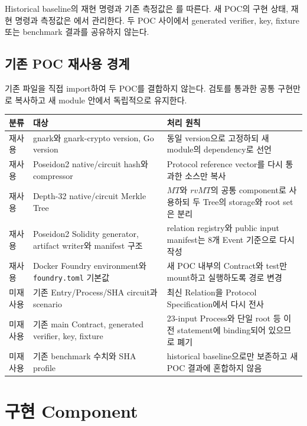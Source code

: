 \documentclass[11pt,a4paper]{extarticle}
\begin{document}
Historical baseline의 재현 명령과 기존 측정값은 를 따른다.
새 POC의 구현 상태, 재현 명령과 측정값은 에서 관리한다.
두 POC 사이에서 generated verifier, key, fixture 또는 benchmark 결과를 공유하지 않는다.

\subsection{기존 POC 재사용 경계}

기존 파일을 직접 import하여 두 POC를 결합하지 않는다. 검토를 통과한 공통 구현만
로 복사하고 새 module 안에서 독립적으로 유지한다.

\begin{longtable}{@{}p{}p{}p{}@{}}
\toprule
분류 & 대상 & 처리 원칙 \\
\midrule
\endhead
재사용 & gnark와 gnark-crypto version, Go version & 동일 version으로 고정하되 새
module의 dependency로 선언 \\
재사용 & Poseidon2 native/circuit hash와 compressor & Protocol reference vector를
다시 통과한 소스만 복사 \\
재사용 & Depth-32 native/circuit Merkle Tree & $MT$와 $rvMT$의 공통 component로
사용하되 두 Tree의 storage와 root set은 분리 \\
재사용 & Poseidon2 Solidity generator, artifact writer와 manifest 구조 & relation
registry와 public input manifest는 8개 Event 기준으로 다시 작성 \\
재사용 & Docker Foundry environment와 \texttt{foundry.toml} 기본값 & 새 POC 내부의
Contract와 test만 mount하고 실행하도록 경로 변경 \\
미재사용 & 기존 Entry/Process/SHA circuit과 scenario & 최신 Relation을 Protocol
Specification에서 다시 전사 \\
미재사용 & 기존 main Contract, generated verifier, key, fixture & 23-input Process와
단일 root 등 이전 statement에 binding되어 있으므로 폐기 \\
미재사용 & 기존 benchmark 수치와 SHA profile & historical baseline으로만 보존하고
새 POC 결과에 혼합하지 않음 \\
\bottomrule
\end{longtable}

\section{구현 Component}
\end{document}
